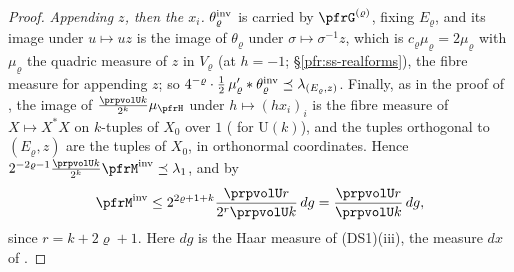 \documentclass[10pt]{amsart}
\theoremstyle{definition}
\theoremstyle{remark}
\providecommand{\auU}{\mathrm U}
\begin{document}
\begin{proof}
\emph{Appending $z$, then the $x_i$.} $\theta_\varrho^{\rm inv}$ is carried by $\pfrG^{(\varrho)}$, fixing $E_\varrho$, and
its image under $u\mapsto uz$ is the image of $\theta_\varrho$ under $\sigma\mapsto\sigma^{-1}z$, which is $c_\varrho\mu_\varrho=
2\mu_\varrho$ with $\mu_\varrho$ the quadric measure of $z$ in $V_\varrho$ (at $h=-1$; \S\ref{pfr:ss-realforms}), the fibre
measure for appending $z$; so $4^{-\varrho}\cdot\frac12\,\mu'_\varrho*\theta_\varrho^{\rm inv}\preceq\lambda_{(E_\varrho,z)}$. Finally,
as in the proof of {\cite[Lemma~8.81(b)]{P51}}, the image of $\frac{\prpvolU k}{2^k}\mu_\pfrH$ under $h\mapsto(hx_i)_i$ is the fibre
measure of $X\mapsto X^*X$ on $k$-tuples of $X_0$ over $1$ ({\cite[Lemma~8.80]{P51}} for $\auU(k)$), and the tuples
orthogonal to $(E_\varrho,z)$ are the tuples of $X_0$, in orthonormal coordinates. Hence
$2^{-2\varrho-1}\frac{\prpvolU k}{2^k}\pfrM^{\rm inv}\preceq\lambda_1$, and by {\cite[Lemma~8.80]{P51}}
\[
\pfrM^{\rm inv}\le2^{2\varrho+1+k}\frac{\prpvolU r}{2^r\prpvolU k}\,dg=\frac{\prpvolU r}{\prpvolU k}\,dg,
\]
since $r=k+2\varrho+1$. Here $dg$ is the Haar measure of \textup{(DS1)(iii)}, the measure $dx$ of
{\cite[\S3.2.1]{P51}}.
\end{proof}
\end{document}
